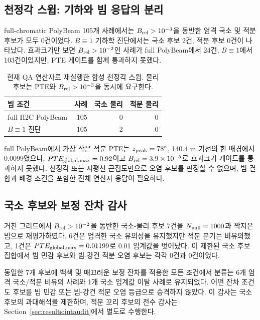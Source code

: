 \documentclass[final,5p,times]{elsarticle}
\newcommand{\NZAPerBeam}{105}
\newcommand{\NZAFullLocalPhys}{0}
\newcommand{\NZAFullIntPhys}{0}
\newcommand{\NZANoBeamLocalPhys}{2}
\newcommand{\NZANoBeamIntPhys}{0}
\newcommand{\NZAFullBiasEtwo}{24}
\newcommand{\NZANoBeamBiasEtwo}{103}
\newcommand{\NCandidateAudit}{7}
\newcommand{\NCandidateLocalRetained}{6}
\newcommand{\NCandidateBeamSensitive}{0}
\newcommand{\NCandidateBeamRobustContam}{0}
\newcommand{\NCandidateDroppedPTE}{0.01199}
\begin{document}
\subsection{천정각 스윕: 기하와 빔 응답의 분리}
\label{sec:results:za}

full-chromatic PolyBeam \NZAPerBeam{}개 사례에서는
$B_{\rm rel}>10^{-3}$을 동반한 엄격 국소 및 적분 후보가 모두 0건이었다.
$B\equiv1$ 기하학 진단에서는 국소 후보 \NZANoBeamLocalPhys{}건,
적분 후보 0건이 나타났다. 효과크기만 보면 $B_{\rm rel}>10^{-2}$인
사례가 full PolyBeam에서 \NZAFullBiasEtwo{}건,
$B\equiv1$에서 \NZANoBeamBiasEtwo{}건이었지만, PTE 게이트를 함께
통과하지 못했다.

\begin{table}[!t]
\centering
\small
\caption{현재 QA 연산자로 재실행한 합성 천정각 스윕. 물리 후보는
PTE와 $B_{\rm rel}>10^{-3}$을 동시에 요구한다.}
\label{tab:za}
\begin{tabular}{lrrr}
\toprule
빔 조건 & 사례 & 국소 물리 & 적분 물리 \\
\midrule
full H2C PolyBeam & \NZAPerBeam & \NZAFullLocalPhys & \NZAFullIntPhys \\
$B\equiv1$ 진단 & \NZAPerBeam & \NZANoBeamLocalPhys & \NZANoBeamIntPhys \\
\bottomrule
\end{tabular}
\end{table}

full PolyBeam에서 가장 작은 적분 PTE는 $z_{\rm peak}=78^\circ$,
140.4 m 기선의 한 배경에서 0.0099였으나,
$PTE_{\rm global,max}=0.92$이고 $B_{\rm rel}=3.9\times10^{-5}$로
효과크기 게이트를 통과하지 못했다. 천정각 또는 지평선 근접도만으로
오염 후보를 판정할 수 없으며, 빔 결합과 배경 조건을 포함한 전체
연산자 응답이 필요하다.

\subsection{국소 후보와 보정 잔차 감사}
\label{sec:results:audit}

거친 그리드에서 $B_{\rm rel}>10^{-2}$을 동반한 국소-물리 후보
\NCandidateAudit{}건을 $N_{\rm null}=1000$과 짝지은 빔으로
재평가하였다. \NCandidateLocalRetained{}건은 엄격한 국소
유의성을 유지했지만 적분 분기는 비유의했고, 1건은
$PTE_{\rm global,max}=\NCandidateDroppedPTE$로 0.01 임계값을
벗어났다. 이 제한된 국소 후보 집합에서 빔 민감 후보와 빔-강건 적분
오염 후보는 각각 \NCandidateBeamSensitive{}건과
\NCandidateBeamRobustContam{}건이었다.

동일한 7개 후보에 백색 및 매끄러운 보정 잔차를 적용한 모든 조건에서
분류는 6개 엄격 국소/적분 비유의 사례와 1개 국소 임계값 이탈 사례로
유지되었다. 어떤 잔차 조건도 후보를 빔 민감 또는 빔-강건 적분 오염
등급으로 승격하지 않았다. 이 감사는 국소 후보의 과대해석을
제한하며, 적분 꼬리 후보의 전수 감사는
Section~\ref{sec:results:intaudit}에서 별도로 수행한다.
\end{document}
